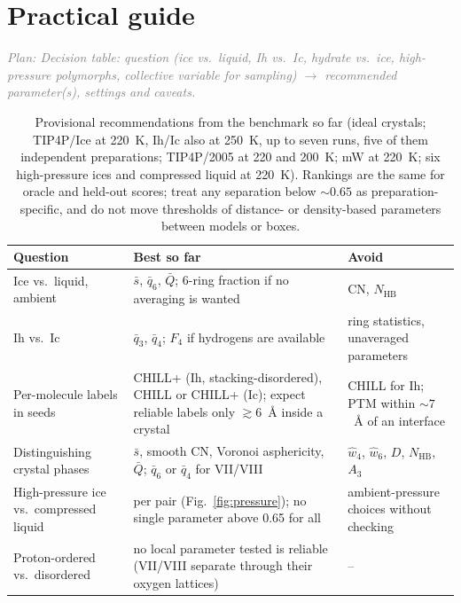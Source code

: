 \documentclass{template1}
\newcommand{\plan}[1]{\par\noindent\textcolor{gray}{\textit{Plan: #1}}\par}
\begin{document}
\chapter{Practical guide}\label{ch:guide}
\plan{Decision table: question (ice vs.\ liquid, Ih vs.\ Ic, hydrate vs.\ ice,
high-pressure polymorphs, collective variable for sampling) $\rightarrow$
recommended parameter(s), settings and caveats.}

\begin{table}[H]
\centering
\small
\caption{Provisional recommendations from the benchmark so far (ideal
crystals; TIP4P/Ice at 220~K, Ih/Ic also at 250~K, up to seven runs, five of them
independent preparations; TIP4P/2005 at 220 and 200~K; mW at 220~K; six
high-pressure ices and compressed liquid at 220~K). Rankings are the same for
oracle and held-out scores; treat any separation below ${\sim}0.65$ as
preparation-specific, and do not move thresholds of distance- or
density-based parameters between models or boxes.}
\label{tab:guide}
\begin{tabular}{p{.27\linewidth}p{.33\linewidth}p{.3\linewidth}}
\toprule
Question & Best so far & Avoid \\
\midrule
Ice vs.\ liquid, ambient & $\bar s$, $\bar q_6$, $\bar Q$; 6-ring fraction if no
averaging is wanted & CN, $N_\mathrm{HB}$ \\
Ih vs.\ Ic & $\bar q_3$, $\bar q_4$; $F_4$ if hydrogens are available & ring
statistics, unaveraged parameters \\
Per-molecule labels in seeds & CHILL+ (Ih, stacking-disordered), CHILL or
CHILL+ (Ic); expect reliable labels only ${\gtrsim}6$~\AA{} inside a
crystal & CHILL for Ih; PTM within ${\sim}7$~\AA{} of an interface \\
Distinguishing crystal phases & $\bar s$, smooth CN, Voronoi asphericity,
$\bar Q$; $\bar q_6$ or $\bar q_4$ for VII/VIII & $\hat w_4$, $\hat w_6$,
$D$, $N_\mathrm{HB}$, $A_3$ \\
High-pressure ice vs.\ compressed liquid & per pair (Fig.~\ref{fig:pressure});
no single parameter above 0.65 for all & ambient-pressure choices without
checking \\
Proton-ordered vs.\ disordered & no local parameter tested is reliable
(VII/VIII separate through their oxygen lattices) &
-- \\
\bottomrule
\end{tabular}
\end{table}
\end{document}
